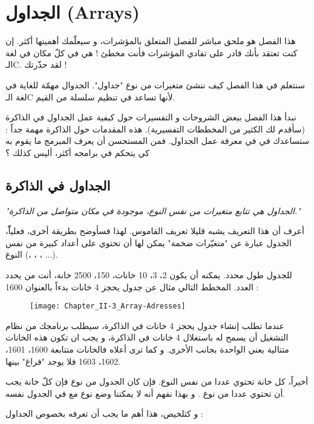 \chapter{الجداول (\textenglish{Arrays})}

هذا الفصل هو ملحق مباشر للفصل المتعلق بالمؤشرات، و سيعلّمك أهميتها أكثر. إن كنت تعتقد بأنك قادر على تفادي المؤشرات فأنت مخطئ ! هي في كلّ مكان في لغة الـ\textenglish{C}. لقد حذّرتك !

سنتعلم في هذا الفصل كيف ننشئ متغيرات من نوع "جداول". الجدوال مهمّة للغاية في لغة الـ\textenglish{C} لأنها تساعد في تنظيم سلسلة من القيم.

نبدأ هذا الفصل ببعض الشروحات و التفسيرات حول كيفية عمل الجداول في الذاكرة (سأقدم لك الكثير من المخططات التفسيرية). هذه المقدمات حول الذاكرة مهمة جداً : ستساعدك في في معرفة عمل الجداول. فمن المستحسن أن يعرف المبرمج ما يقوم به كي يتحكم في برامجه أكثر، أليس كذلك ؟

\section{الجداول في الذاكرة}

\textit{"الجداول هي تتابع متغيرات من نفس النوع، موجودة في مكان متواصل من الذاكرة."}

أعرف أن هذا التعريف يشبه قليلا تعريف القاموس. لهذا فسأوضح بطريقة أخرى، فعلياّّ، الجدول عبارة عن "متغيّرات ضخمة" يمكن لها أن تحتوي على أعداد كبيرة من نفس النوع
(،
،
،
...).

للجدول طول محدد. يمكنه أن يكون 2، 3، 10 خانات، 150، 2500 خانة، أنت من يحدد العدد. المخطط التالي مثال عن جدول يحجز 4 خانات بدءاً بالعنوان 1600 :

\begin{figure}[H]
	\centering
	\texttt{[image: Chapter\_II-3\_Array-Adresses]}
\end{figure}

عندما تطلب إنشاء جدول يحجز 4 خانات في الذاكرة، سيطلب برنامجك من نظام التشغيل أن يسمح له باستغلال 4 خانات في الذاكرة، و يجب ان تكون هذه الخانات متتالية يعني الواحدة بجانب الأخرى. و كما ترى أعلاه فالخانات متتابعة 1600، 1601، 1602، 1603 فلا يوجد "فراغ" بينها.

أخيراً، كل خانة تحتوي عددا من نفس النوع. فإن كان الجدول من نوع
فإن كلّ خانة يجب أن تحتوي عددا من نوع
.
و بهذا نفهم أنه لا يمكننا وضع نوع
مع
في الجدول نفسه.

و كتلخيص، هذا أهم ما يجب أن تعرفه بخصوص الجداول :

